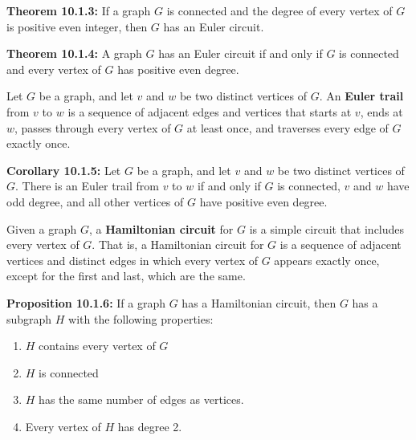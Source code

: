 \documentclass[11pt]{article}
\begin{document}
\bigskip
{\bf Theorem 10.1.3:} If a graph $G$ is connected and the degree of every 
vertex of $G$ is  positive even integer, then $G$ has an Euler circuit. 

\bigskip
{\bf Theorem 10.1.4:} A graph $G$ has an Euler circuit if and only if $G$ 
is connected and every vertex of $G$ has positive even degree. 

\bigskip
Let $G$ be a graph, and let $v$ and $w$ be two distinct vertices of $G$. An 
{\bf Euler trail} from $v$ to $w$ is a sequence of adjacent edges and vertices 
that starts at $v$, ends at $w$, passes through every vertex of $G$ at least 
once, and traverses every edge of $G$ exactly once. 

\bigskip
{\bf Corollary 10.1.5:}{
    Let $G$ be a graph, and let $v$ and $w$ be two distinct vertices of $G$. 
    There is an Euler trail from $v$ to $w$ if and only if $G$ is connected, 
    $v$ and $w$ have odd degree, and all other vertices of $G$ have positive 
    even degree. 
}

\bigskip
Given a graph $G$, a {\bf Hamiltonian circuit} for $G$ is a simple circuit 
that includes every vertex of $G$. That is, a Hamiltonian circuit for $G$ is a 
sequence of adjacent vertices  and distinct edges in which every vertex of $G$ 
appears exactly once, except for the first and last, which are the same. 

\bigskip 
{\bf Proposition 10.1.6:} 
If a graph $G$ has a Hamiltonian circuit, then $G$ has a subgraph $H$ with 
the following properties:
\begin{enumerate}
    \item $H$ contains every vertex of $G$
    \item $H$ is connected 
    \item $H$ has the same number of edges as vertices. 
    \item Every vertex of $H$ has degree 2. 
\end{enumerate}
\end{document}
